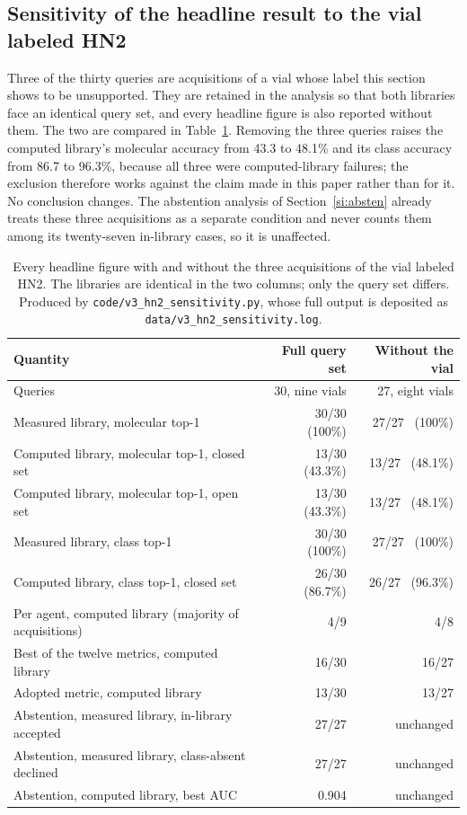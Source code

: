 \documentclass[11pt]{article}
\begin{document}
\subsection{Sensitivity of the headline result to the vial labeled HN2}
\label{si:hn2sens}

Three of the thirty queries are acquisitions of a vial whose label this section shows to be
unsupported. They are retained in the analysis so that both libraries face an identical
query set, and every headline figure is also reported without them. The two are compared in
Table~\ref{tab:si-hn2sens}. Removing the three queries raises the computed library's
molecular accuracy from 43.3 to 48.1\% and its class accuracy from 86.7 to 96.3\%, because
all three were computed-library failures; the exclusion therefore works against the claim
made in this paper rather than for it. No conclusion changes. The abstention analysis of
Section~\ref{si:absten} already treats these three acquisitions as a separate condition and
never counts them among its twenty-seven in-library cases, so it is unaffected.

\begin{table}[htbp]
\centering
\caption{Every headline figure with and without the three acquisitions of the vial labeled
HN2. The libraries are identical in the two columns; only the query set differs. Produced by
\texttt{code/v3\_hn2\_sensitivity.py}, whose full output is deposited as
\texttt{data/v3\_hn2\_sensitivity.log}.}
\label{tab:si-hn2sens}
\small
\begin{tabular}{lrr}
\toprule
Quantity & Full query set & Without the vial \\
\midrule
Queries & 30, nine vials & 27, eight vials \\
\addlinespace
Measured library, molecular top-1 & 30/30 \ (100\%) & 27/27 \ (100\%) \\
Computed library, molecular top-1, closed set & 13/30 \ (43.3\%) & 13/27 \ (48.1\%) \\
Computed library, molecular top-1, open set & 13/30 \ (43.3\%) & 13/27 \ (48.1\%) \\
Measured library, class top-1 & 30/30 \ (100\%) & 27/27 \ (100\%) \\
Computed library, class top-1, closed set & 26/30 \ (86.7\%) & 26/27 \ (96.3\%) \\
\addlinespace
Per agent, computed library (majority of acquisitions) & 4/9 & 4/8 \\
Best of the twelve metrics, computed library & 16/30 & 16/27 \\
Adopted metric, computed library & 13/30 & 13/27 \\
\addlinespace
Abstention, measured library, in-library accepted & 27/27 & unchanged \\
Abstention, measured library, class-absent declined & 27/27 & unchanged \\
Abstention, computed library, best AUC & 0.904 & unchanged \\
\bottomrule
\end{tabular}
\end{table}
\clearpage
\end{document}

